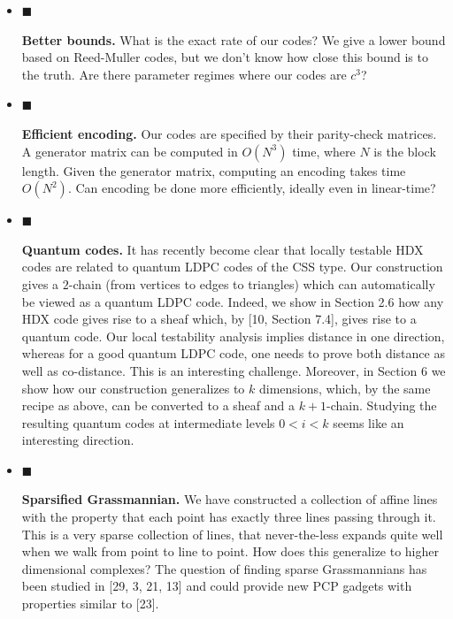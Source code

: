 \begin{itemize}


\item[] 
$\blacksquare$ 


\textbf{Better bounds.} What is the exact rate of our codes? We give a lower bound based on Reed-Muller codes, but we don’t know how close this bound is to the truth. Are there parameter regimes where our codes are $c^{3}$?\par





\item[] 
$\blacksquare$ 


\textbf{Efficient encoding.} Our codes are specified by their parity-check matrices. A generator matrix can be computed in $O(N^{3})$ time, where $N$ is the block length. Given the generator matrix, computing an encoding takes time $O(N^{2})$. Can encoding be done more efficiently, ideally even in linear-time?\par





\item[] 
$\blacksquare$ 


\textbf{Quantum codes.} It has recently become clear that locally testable HDX codes are related to quantum LDPC codes of the CSS type. Our construction gives a $2$-chain (from vertices to edges to triangles) which can automatically be viewed as a quantum LDPC code. Indeed, we show in Section 2.6 how any HDX code gives rise to a sheaf which, by [10, Section 7.4], gives rise to a quantum code. Our local testability analysis implies distance in one direction, whereas for a good quantum LDPC code, one needs to prove both distance as well as co-distance. This is an interesting challenge. Moreover, in Section 6 we show how our construction generalizes to $k$ dimensions, which, by the same recipe as above, can be converted to a sheaf and a $k+1$-chain. Studying the resulting quantum codes at intermediate levels $0<i<k$ seems like an interesting direction.\par





\item[] 
$\blacksquare$ 


\textbf{Sparsified Grassmannian.} We have constructed a collection of affine lines with the property that each point has exactly three lines passing through it. This is a very sparse collection of lines, that never-the-less expands quite well when we walk from point to line to point. How does this generalize to higher dimensional complexes? The question of finding sparse Grassmannians has been studied in [29, 3, 21, 13] and could provide new PCP gadgets with properties similar to [23].\par






\end{itemize}
